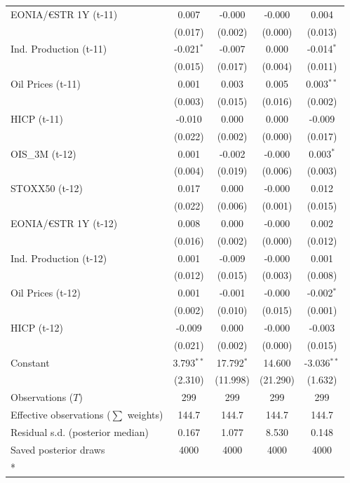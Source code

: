\begin{longtable}[t]{lcccc}
EONIA/€STR 1Y (t-11) & 0.007 & -0.000 & -0.000 & 0.004\\
 & (0.017) & (0.002) & (0.000) & (0.013)\\
Ind. Production (t-11) & -0.021$^{*}$ & -0.007 & 0.000 & -0.014$^{*}$\\
 & (0.015) & (0.017) & (0.004) & (0.011)\\
Oil Prices (t-11) & 0.001 & 0.003 & 0.005 & 0.003$^{**}$\\
 & (0.003) & (0.015) & (0.016) & (0.002)\\
HICP (t-11) & -0.010 & 0.000 & 0.000 & -0.009\\
 & (0.022) & (0.002) & (0.000) & (0.017)\\
OIS\_3M (t-12) & 0.001 & -0.002 & -0.000 & 0.003$^{*}$\\
 & (0.004) & (0.019) & (0.006) & (0.003)\\
STOXX50 (t-12) & 0.017 & 0.000 & -0.000 & 0.012\\
 & (0.022) & (0.006) & (0.001) & (0.015)\\
EONIA/€STR 1Y (t-12) & 0.008 & 0.000 & -0.000 & 0.002\\
 & (0.016) & (0.002) & (0.000) & (0.012)\\
Ind. Production (t-12) & 0.001 & -0.009 & -0.000 & 0.001\\
 & (0.012) & (0.015) & (0.003) & (0.008)\\
Oil Prices (t-12) & 0.001 & -0.001 & -0.000 & -0.002$^{*}$\\
 & (0.002) & (0.010) & (0.015) & (0.001)\\
HICP (t-12) & -0.009 & 0.000 & -0.000 & -0.003\\
 & (0.021) & (0.002) & (0.000) & (0.015)\\
Constant & 3.793$^{**}$ & 17.792$^{*}$ & 14.600 & -3.036$^{**}$\\
 & (2.310) & (11.998) & (21.290) & (1.632)\\
\midrule
Observations ($T$) & 299 & 299 & 299 & 299\\
Effective observations ($\sum$ weights) & 144.7 & 144.7 & 144.7 & 144.7\\
Residual s.d. (posterior median) & 0.167 & 1.077 & 8.530 & 0.148\\
Saved posterior draws & 4000 & 4000 & 4000 & 4000\\*
\end{longtable}
\endgroup{}

\begingroup\fontsize{7}{9}\selectfont

